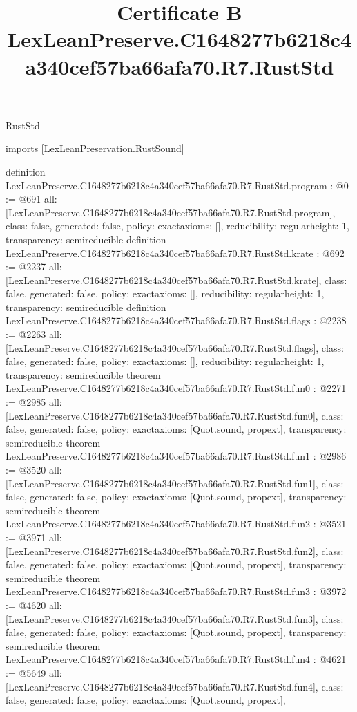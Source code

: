 \begin{lexlean}{RustStd}
\title{Certificate B LexLeanPreserve.C1648277b6218c4a340cef57ba66afa70.R7.RustStd}
\begin{coremodule}
imports [LexLeanPreservation.RustSound]

definition LexLeanPreserve.C1648277b6218c4a340cef57ba66afa70.R7.RustStd.program : @0 := @691 {
  all: [LexLeanPreserve.C1648277b6218c4a340cef57ba66afa70.R7.RustStd.program],
  class: false,
  generated: false,
  policy: exact{axioms: []},
  reducibility: regular{height: 1},
  transparency: semireducible
}
definition LexLeanPreserve.C1648277b6218c4a340cef57ba66afa70.R7.RustStd.krate : @692 := @2237 {
  all: [LexLeanPreserve.C1648277b6218c4a340cef57ba66afa70.R7.RustStd.krate],
  class: false,
  generated: false,
  policy: exact{axioms: []},
  reducibility: regular{height: 1},
  transparency: semireducible
}
definition LexLeanPreserve.C1648277b6218c4a340cef57ba66afa70.R7.RustStd.flags : @2238 := @2263 {
  all: [LexLeanPreserve.C1648277b6218c4a340cef57ba66afa70.R7.RustStd.flags],
  class: false,
  generated: false,
  policy: exact{axioms: []},
  reducibility: regular{height: 1},
  transparency: semireducible
}
theorem LexLeanPreserve.C1648277b6218c4a340cef57ba66afa70.R7.RustStd.fun0 : @2271 := @2985 {
  all: [LexLeanPreserve.C1648277b6218c4a340cef57ba66afa70.R7.RustStd.fun0],
  class: false,
  generated: false,
  policy: exact{axioms: [Quot.sound, propext]},
  transparency: semireducible
}
theorem LexLeanPreserve.C1648277b6218c4a340cef57ba66afa70.R7.RustStd.fun1 : @2986 := @3520 {
  all: [LexLeanPreserve.C1648277b6218c4a340cef57ba66afa70.R7.RustStd.fun1],
  class: false,
  generated: false,
  policy: exact{axioms: [Quot.sound, propext]},
  transparency: semireducible
}
theorem LexLeanPreserve.C1648277b6218c4a340cef57ba66afa70.R7.RustStd.fun2 : @3521 := @3971 {
  all: [LexLeanPreserve.C1648277b6218c4a340cef57ba66afa70.R7.RustStd.fun2],
  class: false,
  generated: false,
  policy: exact{axioms: [Quot.sound, propext]},
  transparency: semireducible
}
theorem LexLeanPreserve.C1648277b6218c4a340cef57ba66afa70.R7.RustStd.fun3 : @3972 := @4620 {
  all: [LexLeanPreserve.C1648277b6218c4a340cef57ba66afa70.R7.RustStd.fun3],
  class: false,
  generated: false,
  policy: exact{axioms: [Quot.sound, propext]},
  transparency: semireducible
}
theorem LexLeanPreserve.C1648277b6218c4a340cef57ba66afa70.R7.RustStd.fun4 : @4621 := @5649 {
  all: [LexLeanPreserve.C1648277b6218c4a340cef57ba66afa70.R7.RustStd.fun4],
  class: false,
  generated: false,
  policy: exact{axioms: [Quot.sound, propext]},
}
\end{coremodule}
\end{lexlean}
